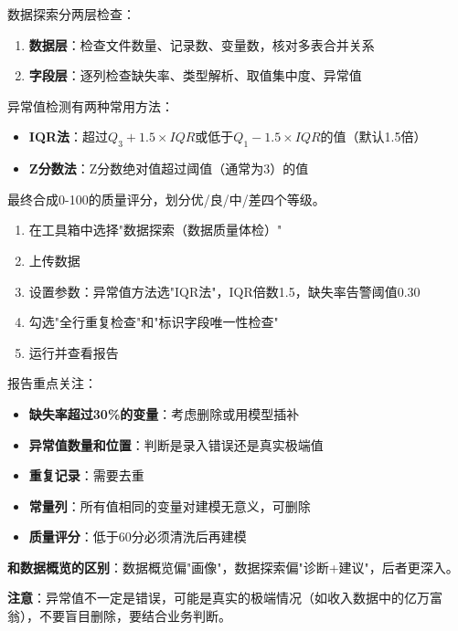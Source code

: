 \begin{algoprinciple}
数据探索分两层检查：
\begin{enumerate}
    \item \textbf{数据层}：检查文件数量、记录数、变量数，核对多表合并关系
    \item \textbf{字段层}：逐列检查缺失率、类型解析、取值集中度、异常值
\end{enumerate}

异常值检测有两种常用方法：
\begin{itemize}
    \item \textbf{IQR法}：超过$Q_3+1.5\times IQR$或低于$Q_1-1.5\times IQR$的值（默认1.5倍）
    \item \textbf{Z分数法}：Z分数绝对值超过阈值（通常为3）的值
\end{itemize}

最终合成0-100的质量评分，划分优/良/中/差四个等级。
\end{algoprinciple}

\begin{algosposs}
\begin{enumerate}
    \item 在工具箱中选择"数据探索（数据质量体检）"
    \item 上传数据
    \item 设置参数：异常值方法选"IQR法"，IQR倍数1.5，缺失率告警阈值0.30
    \item 勾选"全行重复检查"和"标识字段唯一性检查"
    \item 运行并查看报告
\end{enumerate}
\end{algosposs}

\begin{algoresult}
报告重点关注：
\begin{itemize}
    \item \textbf{缺失率超过30\%的变量}：考虑删除或用模型插补
    \item \textbf{异常值数量和位置}：判断是录入错误还是真实极端值
    \item \textbf{重复记录}：需要去重
    \item \textbf{常量列}：所有值相同的变量对建模无意义，可删除
    \item \textbf{质量评分}：低于60分必须清洗后再建模
\end{itemize}
\end{algoresult}

\begin{algonotes}
\textbf{和数据概览的区别}：数据概览偏"画像"，数据探索偏"诊断+建议"，后者更深入。

\textbf{注意}：异常值不一定是错误，可能是真实的极端情况（如收入数据中的亿万富翁），不要盲目删除，要结合业务判断。
\end{algonotes}

